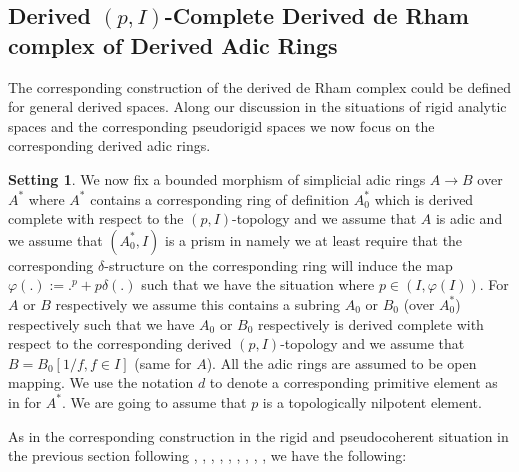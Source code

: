 \documentclass[11pt]{book}
\theoremstyle{definition}
\numberwithin{equation}{section}
\newtheorem{setting}[theorem]{Setting}
\begin{document}
\newpage

\subsection{Derived $(p,I)$-Complete Derived de Rham complex of Derived Adic Rings}



\indent The corresponding construction of the derived de Rham complex could be defined for general derived spaces. Along our discussion in the situations of rigid analytic spaces and the corresponding pseudorigid spaces we now focus on the corresponding derived adic rings. 

\begin{setting}
We now fix a bounded morphism of simplicial adic rings $A\rightarrow B$ over $A^*$ where $A^*$ contains a corresponding ring of definition $A^*_0$ which is derived complete with respect to the $(p,I)$-topology and we assume that $A$ is adic and we assume that $(A^*_0,I)$ is a prism in \cite{12BS} namely we at least require that the corresponding $\delta$-structure on the corresponding ring will induce the map $\varphi(.):=.^p+p\delta(.)$ such that we have the situation where $p\in (I,\varphi(I))$. For $A$ or $B$ respectively we assume this contains a subring $A_0$ or $B_0$ (over $A_0^*$) respectively such that we have $A_0$ or $B_0$ respectively is derived complete with respect to the corresponding derived $(p,I)$-topology and we assume that $B=B_0[1/f,f\in I]$ (same for $A$). All the adic rings are assumed to be open mapping. We use the notation $d$ to denote a corresponding primitive element as in \cite[Section 2.3]{12BS} for $A^*$. We are going to assume that $p$ is a topologically nilpotent element.
\end{setting}



\indent As in the corresponding construction in the rigid and pseudocoherent situation in the previous section following \cite[Chapitre 3]{12An1}, \cite{12An2}, \cite[Chapter 2, Chapter 8]{12B1}, \cite[Chapter 1]{12Bei}, \cite[Chapter 5]{12G1}, \cite[Chapter 3, Chapter 4]{12GL}, \cite[Chapitre II, Chapitre III]{12Ill1}, \cite[Chapitre VIII]{12Ill2}, \cite[Section 4]{12Qui}, we have the following: 
\end{document}
